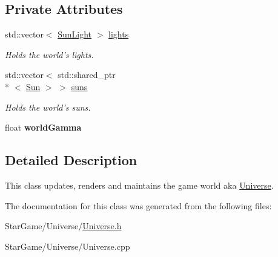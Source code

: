 \subsection*{Private Attributes}
\begin{DoxyCompactItemize}
\item 
\hypertarget{class_universe_a48a408b8a01b50f05df5fc20ae2e99a8}{std\-::vector$<$ \hyperlink{class_sun_light}{Sun\-Light} $>$ \hyperlink{class_universe_a48a408b8a01b50f05df5fc20ae2e99a8}{lights}}\label{class_universe_a48a408b8a01b50f05df5fc20ae2e99a8}

\begin{DoxyCompactList}\small\item\em Holds the world's lights. \end{DoxyCompactList}\item 
\hypertarget{class_universe_a958fd8a9e69878b1ae4526ab692ada9e}{std\-::vector$<$ std\-::shared\-\_\-ptr\\*
$<$ \hyperlink{class_sun}{Sun} $>$ $>$ \hyperlink{class_universe_a958fd8a9e69878b1ae4526ab692ada9e}{suns}}\label{class_universe_a958fd8a9e69878b1ae4526ab692ada9e}

\begin{DoxyCompactList}\small\item\em Holds the world's suns. \end{DoxyCompactList}\item 
\hypertarget{class_universe_afaf8026ff2c6560ea3ae7ced43765919}{float {\bfseries world\-Gamma}}\label{class_universe_afaf8026ff2c6560ea3ae7ced43765919}

\end{DoxyCompactItemize}


\subsection{Detailed Description}
This class updates, renders and maintains the game world aka \hyperlink{class_universe}{Universe}. 

The documentation for this class was generated from the following files\-:\begin{DoxyCompactItemize}
\item 
Star\-Game/\-Universe/\hyperlink{_universe_8h}{Universe.\-h}\item 
Star\-Game/\-Universe/Universe.\-cpp\end{DoxyCompactItemize}
